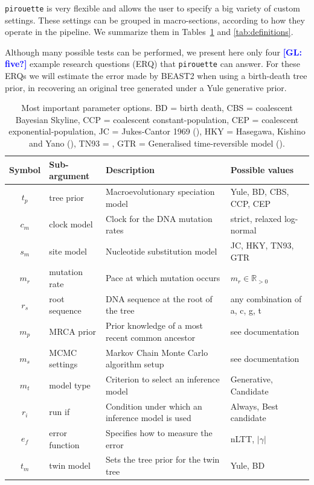 \documentclass{article}
\newcommand{\giovanni}[1]{\textcolor{blue}{\textbf{[GL: #1]}}}
\begin{document}
\verb;pirouette; is very flexible and allows the user 
to specify a big variety of custom settings. 
These settings can be grouped in macro-sections, 
according to how they operate in the pipeline. 
We summarize them in Tables~\ref{tab:options} and \ref{tab:definitions}.

Although many possible tests can be performed, 
we present here only four \giovanni{five?} example research questions (ERQ) that \verb;pirouette; can answer. 
For these ERQs we will estimate the error made by BEAST2 when 
using a birth-death tree prior, in recovering an original tree 
generated under a Yule generative prior.



\begin{table}
\centering
  \begin{tabular}{|@{}c|p{2.5cm}|p{9cm}|p{4.5cm}@{}|}
    \hline
    \centering
    \textbf{Symbol} & \textbf{Sub-argument} & \textbf{Description} & \textbf{Possible values} \\ 
    \hline
    $\mathit{t_{p}}$ & tree prior & Macroevolutionary speciation model & Yule, BD, CBS, CCP, CEP \\
    $\mathit{c_{m}}$ & clock model & Clock for the DNA mutation rates & strict, relaxed log-normal \\
    $\mathit{s_{m}}$ & site model & Nucleotide substitution model & JC, HKY, TN93, GTR \\
    $\mathit{m_{r}}$ & mutation rate & Pace at which mutation occurs & $m_{r} \in \mathbb{R}_{>0}$\\
    $\mathit{r_{s}}$ & root sequence & DNA sequence at the root of the tree & any combination of a, c, g, t \\
    $\mathit{m_{p}}$ & MRCA prior & Prior knowledge of a most recent common ancestor & see documentation \\
    $\mathit{m_{s}}$ & MCMC settings & Markov Chain Monte Carlo algorithm setup & see documentation \\
    $\mathit{m_{t}}$ & model type & Criterion to select an inference model & Generative, Candidate \\
    $\mathit{r_{i}}$ & run if & Condition under which an inference model is used & Always, Best candidate\\
    $\mathit{e_{f}}$ & error function & Specifies how to measure the error & nLTT, $|\gamma|$ \\
    $\mathit{t_{m}}$ & twin model & Sets the tree prior for the twin tree & Yule, BD \\
    \hline
  \end{tabular}
  \caption{
    Most important parameter options. BD = birth death, CBS = coalescent
    Bayesian Skyline, CCP = coalescent constant-population, CEP = coalescent
    exponential-population, JC = Jukes-Cantor 1969 (\cite{jukes1969evolution}), HKY = Hasegawa, Kishino and 
    Yano (\cite{hasegawa1985dating}), TN93 = \cite{tamura1993estimation}, GTR = Generalised time-reversible 
    model (\cite{tavare1986some}).
  }
  \label{tab:options}
\bigskip


\end{table}
\end{document}
